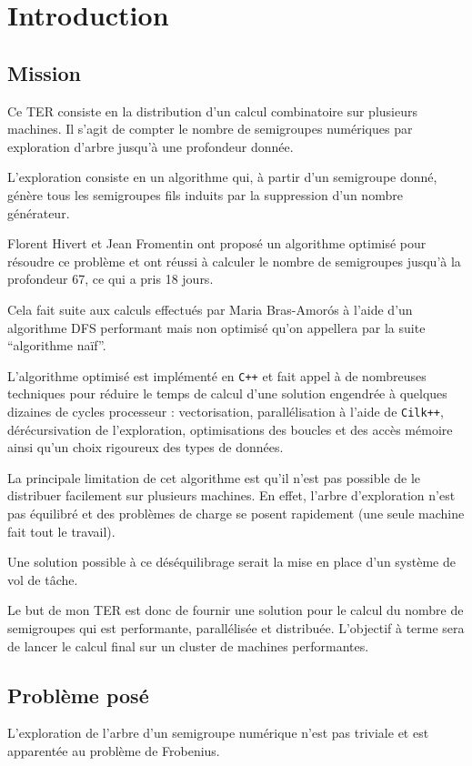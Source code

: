 \documentclass[12pt,a4paper]{article}
\begin{document}
\section*{Introduction}

\subsection*{Mission}
Ce TER consiste en la distribution d'un calcul combinatoire sur plusieurs machines. Il s'agit de compter le nombre de semigroupes numériques par exploration d'arbre jusqu'à une profondeur donnée.

L'exploration consiste en un algorithme qui, à partir d'un semigroupe donné, génère tous les semigroupes fils induits par la suppression d'un nombre générateur.

Florent Hivert et Jean Fromentin ont proposé un algorithme optimisé pour résoudre ce problème et ont réussi à calculer le nombre de semigroupes jusqu'à la profondeur 67, ce qui a pris 18 jours.

Cela fait suite aux calculs effectués par Maria Bras-Amorós à l'aide d'un algorithme DFS performant mais non optimisé qu'on appellera par la suite ``algorithme naïf''.

L'algorithme optimisé est implémenté en \texttt{C++} et fait appel à de nombreuses techniques pour réduire le temps de calcul d'une solution engendrée à quelques dizaines de cycles processeur : vectorisation, parallélisation à l'aide de \texttt{Cilk++}, dérécursivation de l'exploration, optimisations des boucles et des accès mémoire ainsi qu'un choix rigoureux des types de données.

La principale limitation de cet algorithme est qu'il n'est pas possible de le distribuer facilement sur plusieurs machines. En effet, l'arbre d'exploration n'est pas équilibré et des problèmes de charge se posent rapidement (une seule machine fait tout le travail).

Une solution possible à ce déséquilibrage serait la mise en place d'un système de vol de tâche.

Le but de mon TER est donc de fournir une solution pour le calcul du nombre de semigroupes qui est performante, parallélisée et distribuée. L'objectif à terme sera de lancer le calcul final sur un cluster de machines performantes.

\subsection*{Problème posé}
L'exploration de l'arbre d'un semigroupe numérique n'est pas triviale et est apparentée au problème de Frobenius.
\end{document}

